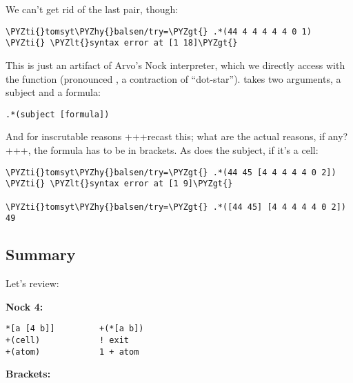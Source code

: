 We can't get rid of the last pair, though:

\begin{framed_shaded}
\begin{Verbatim}[fontsize=\relsize{-2.5},commandchars=\\\{\}]
\PYZti{}tomsyt\PYZhy{}balsen/try=\PYZgt{} .*(44 4 4 4 4 4 0 1)
\PYZti{} \PYZlt{}syntax error at [1 18]\PYZgt{}
\end{Verbatim}
\end{framed_shaded}

This is just an artifact of Arvo's Nock interpreter, which we directly access
with the  function (pronounced , a contraction of ``dot-star'').  takes two
arguments, a subject and a formula:
\begin{framed_shaded}
\begin{Verbatim}[fontsize=\relsize{-2.5},commandchars=\\\{\}]
.*(subject [formula])
\end{Verbatim}
\end{framed_shaded}
And for inscrutable reasons  +++recast this; what are the actual reasons, if any?+++, the formula has to be in brackets. As does the
subject, if it's a cell:
\begin{framed_shaded}
\begin{Verbatim}[fontsize=\relsize{-2.5},commandchars=\\\{\}]
\PYZti{}tomsyt\PYZhy{}balsen/try=\PYZgt{} .*(44 45 [4 4 4 4 4 0 2])
\PYZti{} \PYZlt{}syntax error at [1 9]\PYZgt{}

\PYZti{}tomsyt\PYZhy{}balsen/try=\PYZgt{} .*([44 45] [4 4 4 4 4 0 2])
49
\end{Verbatim}
\end{framed_shaded}

\subsection{Summary}

Let's review:

\textbf{Nock 4:}
\begin{framed_shaded}
\begin{Verbatim}[fontsize=\relsize{-2.5},commandchars=\\\{\}]
*[a [4 b]]         +(*[a b])
+(cell)            ! exit
+(atom)            1 + atom
\end{Verbatim}
\end{framed_shaded}
\textbf{Brackets:}

